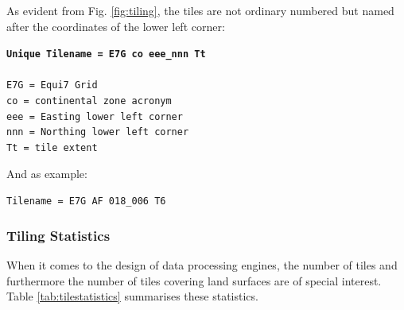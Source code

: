 \documentclass[10pt,a4paper]{article}
\begin{document}
As evident from Fig. \ref{fig:tiling}, the tiles are not ordinary numbered but named after the coordinates of the lower left corner:

\texttt{\textbf{Unique Tilename = E7G co eee\_nnn\ Tt}} \\
\\
\texttt{E7G = Equi7 Grid} \\
\texttt{co = continental zone acronym} \\
\texttt{eee = Easting lower left corner} \\
\texttt{nnn = Northing lower left corner} \\
\texttt{Tt = tile extent}


And as example:

\texttt{Tilename = E7G AF 018\_006 T6}


\subsubsection*{Tiling Statistics}

When it comes to the design of data processing engines, the number of tiles and furthermore the number of tiles covering land surfaces are of special interest. Table \ref{tab:tilestatistics} summarises these statistics.
\end{document}
